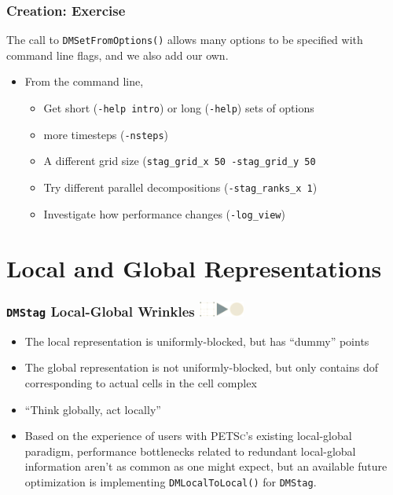 \documentclass{beamer}
\newcommand\frametitlelogo[1]{\frametitle{#1\hspace{0pt plus 1 filll} \includegraphics[width=42pt]{logo_slides}}}
\newcommand{\PETSc}{\textsc{PETSc}}
\begin{document}
\begin{frame}[fragile]
\frametitle{Creation: Exercise}
  The call to \lstinline{DMSetFromOptions()} allows many options to be specified with command line flags,
  and we also add our own.
  \begin{itemize}
  \item From the command line,
    \begin{itemize}
      \item Get short (\lstinline{-help intro}) or long (\lstinline{-help}) sets of options
      \item more timesteps  (\lstinline{-nsteps})
      \item A different grid size (\lstinline{stag_grid_x 50 -stag_grid_y 50}
      \item Try different parallel decompositions (\lstinline{-stag_ranks_x 1})
      \item Investigate how performance changes (\lstinline{-log_view})
    \end{itemize}
  \end{itemize}
\end{frame}

\section{Local and Global Representations}

\begin{frame}[fragile]
  \frametitlelogo{\texttt{DMStag} Local-Global Wrinkles}
\begin{itemize}
  \item The local representation is uniformly-blocked, but has ``dummy'' points
  \item The global representation is not uniformly-blocked, but only contains dof corresponding to actual cells in the cell complex
  \item ``Think globally, act locally''
  \item Based on the experience of users with \PETSc{}'s existing local-global paradigm, performance bottlenecks related to redundant local-global information aren't as common as one might expect, but an available future optimization is implementing \lstinline{DMLocalToLocal()} for \texttt{DMStag}.
\end{itemize}
\end{frame}
\end{document}
